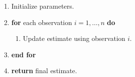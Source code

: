 \begin{enumerate}
  \item Initialize parameters.
  \item \textbf{for} each observation $i = 1,\dots,n$ \textbf{do}
    \begin{enumerate}
      \item Update estimate using observation $i$.
    \end{enumerate}
  \item \textbf{end for}
  \item \textbf{return} final estimate.
\end{enumerate}
